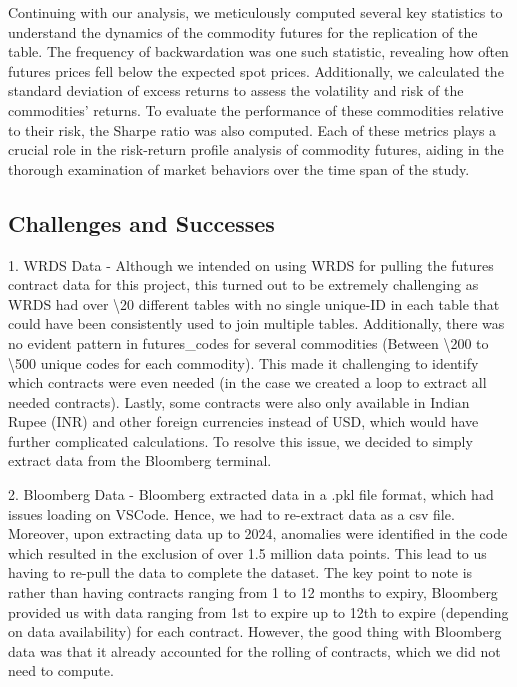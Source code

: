 \documentclass{article}
\begin{document}
Continuing with our analysis, we meticulously computed several key statistics to understand the dynamics of the commodity futures for the replication of the table. The frequency of backwardation was one such statistic, revealing how often futures prices fell below the expected spot prices. Additionally, we calculated the standard deviation of excess returns to assess the volatility and risk of the commodities' returns. To evaluate the performance of these commodities relative to their risk, the Sharpe ratio was also computed. Each of these metrics plays a crucial role in the risk-return profile analysis of commodity futures, aiding in the thorough examination of market behaviors over the time span of the study.

\subsection{Challenges and Successes}

1. WRDS Data - Although we intended on using WRDS for pulling the futures contract data for this project, this turned out to be extremely challenging as WRDS had over \textbackslash 20 different tables with no single unique-ID in each table that could have been consistently used to join multiple tables. Additionally, there was no evident pattern in futures\_codes for several commodities (Between \textbackslash{200} to \textbackslash{500} unique codes for each commodity). This made it challenging to identify which contracts were even needed (in the case we created a loop to extract all needed contracts). Lastly, some contracts were also only available in Indian Rupee (INR) and other foreign currencies instead of USD, which would have further complicated calculations. To resolve this issue, we decided to simply extract data from the Bloomberg terminal.

2. Bloomberg Data - Bloomberg extracted data in a .pkl file format, which had issues loading on VSCode. Hence, we had to re-extract data as a csv file. Moreover, upon extracting data up to 2024, anomalies were identified in the code which resulted in the exclusion of over 1.5 million data points. This lead to us having to re-pull the data to complete the dataset. The key point to note is rather than having contracts ranging from 1 to 12 months to expiry, Bloomberg provided us with data ranging from 1st to expire up to 12th to expire (depending on data availability) for each contract. However, the good thing with Bloomberg data was that it already accounted for the rolling of contracts, which we did not need to compute.
\end{document}
